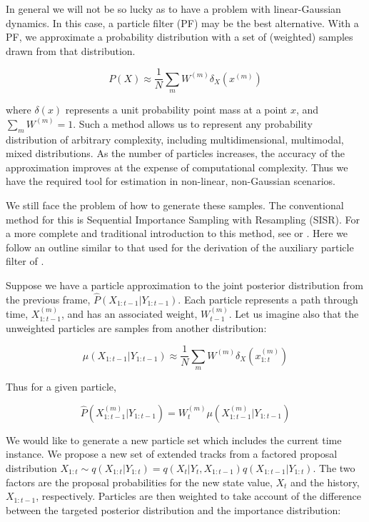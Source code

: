 In general we will not be so lucky as to have a problem with linear-Gaussian dynamics. In this case, a particle filter (PF) may be the best alternative. With a PF, we approximate a probability distribution with a set of (weighted) samples drawn from that distribution.

\begin{equation}
P(X) \approx \frac{1}{N} \sum_m{W^{(m)} \delta_{X} (x^{(m)})}
\label{eq:ParticleApprox}
\end{equation}

where $\delta (x)$ represents a unit probability point mass at a point $x$, and $\sum_m{W^{(m)}}=1$. Such a method allows us to represent any probability distribution of arbitrary complexity, including multidimensional, multimodal, mixed distributions. As the number of particles increases, the accuracy of the approximation improves at the expense of computational complexity. Thus we have the required tool for estimation in non-linear, non-Gaussian scenarios.

We still face the problem of how to generate these samples. The conventional method for this is Sequential Importance Sampling with Resampling (SISR). For a more complete and traditional introduction to this method, see \cite{Cappe2007} or \cite{Doucet2009}. Here we follow an outline similar to that used for the derivation of the auxiliary particle filter of \cite{Pitt1999}.

Suppose we have a particle approximation to the joint posterior distribution from the previous frame, $\hat{P}(X_{1:t-1}|Y_{1:t-1})$. Each particle represents a path through time, $X_{1:t-1}^{(m)}$, and has an associated weight, $W_{t-1}^{(m)}$. Let us imagine also that the unweighted particles are samples from another distribution:

\begin{equation}
\mu(X_{1:t-1}|Y_{1:t-1}) \approx \frac{1}{N} \sum_m{W^{(m)} \delta_{X} (x_{1:t}^{(m)})}
\label{eq:UnweightParticleDistn}
\end{equation}

Thus for a given particle,

\begin{equation}
\hat{P}(X_{1:t-1}^{(m)}|Y_{1:t-1}) = W_t^{(m)} \mu(X_{1:t-1}^{(m)}|Y_{1:t-1})
\label{eq:}
\end{equation}

We would like to generate a new particle set which includes the current time instance. We propose a new set of extended tracks from a factored proposal distribution $X_{1:t} \sim q(X_{1:t}|Y_{1:t}) = q(X_{t}|Y_{t}, X_{1:t-1}) q(X_{1:t-1}|Y_{1:t})$. The two factors are the proposal probabilities for the new state value, $X_t$ and the history, $X_{1:t-1}$, respectively. Particles are then weighted to take account of the difference between the targeted posterior distribution and the importance distribution:

